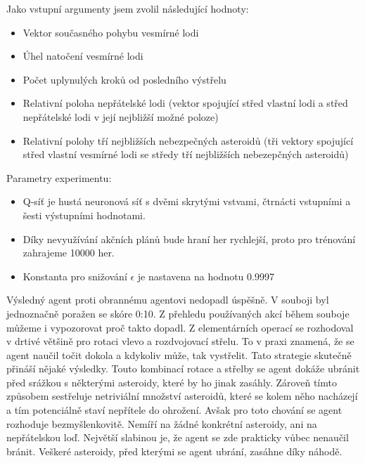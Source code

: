 \par
Jako vstupní argumenty jsem zvolil následující hodnoty:
\begin{itemize}
    \item Vektor současného pohybu vesmírné lodi
    \item Úhel natočení vesmírné lodi
    \item Počet uplynulých kroků od posledního výstřelu
    \item Relativní poloha nepřátelské lodi (vektor spojující střed vlastní lodi a střed nepřátelské lodi v její nejbližší možné poloze)
    \item Relativní polohy tří nejbližších nebezpečných asteroidů (tři vektory spojující střed vlastní vesmírné lodi se středy tří nejbližších nebezepčných asteroidů)
\end{itemize}

Parametry experimentu:
\begin{itemize}
    \item Q-síť je hustá neuronová síť s dvěmi skrytými vstvami, čtrnácti vstupními a šesti výstupními hodnotami.
    \item Díky nevyužívání akčních plánů bude hraní her rychlejší, proto pro trénování zahrajeme 10000 her.
    \item Konstanta pro snižování $\epsilon$ je nastavena na hodnotu 0.9997
\end{itemize}


Výsledný agent proti obrannému agentovi nedopadl úspěšně. V souboji byl jednoznačně poražen se skóre 0:10.
Z přehledu používaných akcí během souboje můžeme i vypozorovat proč takto dopadl. Z elementárních operací se rozhodoval v drtivé většině pro rotaci vlevo a rozdvojovací střelu.
To v praxi znamená, že se agent naučil točit dokola a kdykoliv může, tak vystřelit. Tato strategie skutečně přináší nějaké výsledky.
Touto kombinací rotace a střelby se agent dokáže ubránit před srážkou s některými asteroidy, které by ho jinak zasáhly. Zároveň tímto způsobem sestřeluje netriviální množství asteroidů, které se kolem něho nacházejí a tím potenciálně staví nepřítele do ohrožení.
Avšak pro toto chování se agent rozhoduje bezmyšlenkovitě. 
Nemíří na žádné konkrétní asteroidy, ani na nepřátelskou loď.
Největší slabinou je, že agent se zde prakticky vůbec nenaučil bránit.
Veškeré asteroidy, před kterými se agent ubrání, zasáhne díky náhodě.


